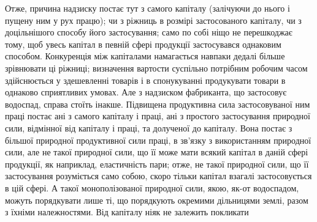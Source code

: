 Отже, причина надзиску постає тут з самого капіталу (залічуючи до
нього і пущену ним у рух працю); чи з ріжниць в розмірі застосованого
капіталу, чи з доцільнішого способу його застосування; само по собі ніщо не
перешкоджає тому, щоб увесь капітал в певній сфері продукції застосувався
однаковим способом. Конкуренція між капіталами намагається навпаки дедалі
більше зрівнювати ці ріжниці; визначення вартости суспільно потрібним робочим
часом здійснюється у здешевленні товарів і в спонукуванні продукувати товари
в однаково сприятливих умовах. Але з надзиском фабриканта, що застосовує
водоспад, справа стоїть інакше. Підвищена продуктивна сила застосовуваної
ним праці постає ані з самого капіталу і праці, ані з простого застосування
природної сили, відмінної від капіталу і праці, та долученої до капіталу. Вона
постає з більшої природної продуктивної сили праці, в зв’язку з використанням
природної сили, але не такої природної сили, що її може мати всякий капітал
в даній сфері продукції, як наприклад, еластичність пари; отже, не такої природної
сили, що її застосування розуміється само собою, скоро тільки капітал
взагалі застосовується в цій сфері. А такої монополізованої природної сили, якою,
як-от водоспадом, можуть порядкувати лише ті, що порядкують окремими дільницями
землі, разом з їхніми належностями. Від капіталу ніяк не залежить покликати
\parbreak{}  %
